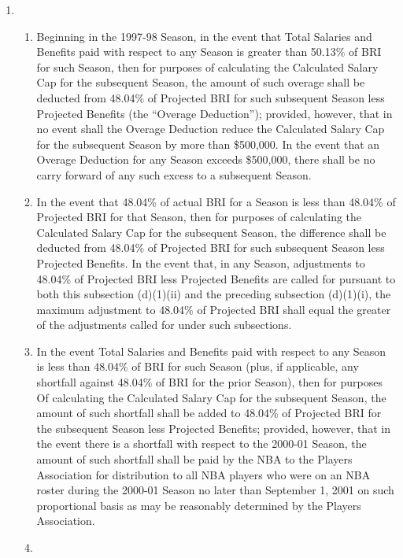 \documentclass[
]{book}
\providecommand{\tightlist}{%
  \setlength{\itemsep}{0pt}\setlength{\parskip}{0pt}}
\begin{document}
\begin{enumerate}
  \begin{enumerate}
  \def\labelenumii{(\arabic{enumii})}
  \item
    \begin{enumerate}
    \def\labelenumiii{(\roman{enumiii})}
    \tightlist
    \item
      Beginning in the 1997-98 Season, in the event that Total Salaries and Benefits paid with respect to any Season is greater than 50.13\% of BRI for such Season, then for purposes of calculating the Calculated Salary Cap for the subsequent Season, the amount of such overage shall be deducted from 48.04\% of Projected BRI for such subsequent Season less Projected Benefits (the ``Overage Deduction''); provided, however, that in no event shall the Overage Deduction reduce the Calculated Salary Cap for the subsequent Season by more than \$500,000. In the event that an Overage Deduction for any Season exceeds \$500,000, there shall be no carry forward of any such excess to a subsequent Season.
    \item
      In the event that 48.04\% of actual BRI for a Season is less than 48.04\% of Projected BRI for that Season, then for purposes of calculating the Calculated Salary Cap for the subsequent Season, the difference shall be deducted from 48.04\% of Projected BRI for such subsequent Season less Projected Benefits. In the event that, in any Season, adjustments to 48.04\% of Projected BRI less Projected Benefits are called for pursuant to both this subsection (d)(1)(ii) and the preceding subsection (d)(1)(i), the maximum adjustment to 48.04\% of Projected BRI shall equal the greater of the adjustments called for under such subsections.
    \item
      In the event Total Salaries and Benefits paid with respect to any Season is less than 48.04\% of BRI for such Season (plus, if applicable, any shortfall against 48.04\% of BRI for the prior Season), then for purposes Of calculating the Calculated Salary Cap for the subsequent Season, the amount of such shortfall shall be added to 48.04\% of Projected BRI for the subsequent Season less Projected Benefits; provided, however, that in the event there is a shortfall with respect to the 2000-01 Season, the amount of such shortfall shall be paid by the NBA to the Players Association for distribution to all NBA players who were on an NBA roster during the 2000-01 Season no later than September 1, 2001 on such proportional basis as may be reasonably determined by the Players Association.
    \item

\end{enumerate}
\end{enumerate}
\end{enumerate}
\end{document}
